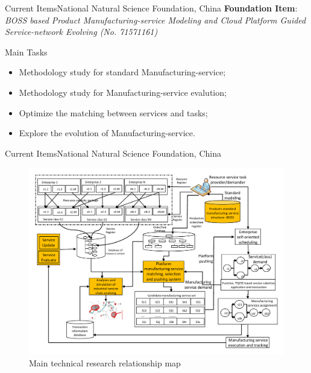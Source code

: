 \begin{frame}{Current Items}{National Natural Science Foundation, China}
\textbf{Foundation Item}: \textit{BOSS based Product Manufacturing-service Modeling and Cloud Platform Guided Service-network Evolving (No. 71571161)}
\begin{block}{Main Tasks}
\begin{itemize}
\item Methodology study for standard Manufacturing-service;
\item Methodology study for Manufacturing-service evalution;
\item Optimize the matching between services and tasks;
\item Explore the evolution of Manufacturing-service.
\end{itemize}
\end{block}
\end{frame}
\begin{frame}{Current Items}{National Natural Science Foundation, China}
	\begin{figure}
		\centering
		\includegraphics[height=0.85\textheight]{figures/nsf.pdf}
		\caption{Main technical research relationship map}
	\end{figure}
\end{frame}

